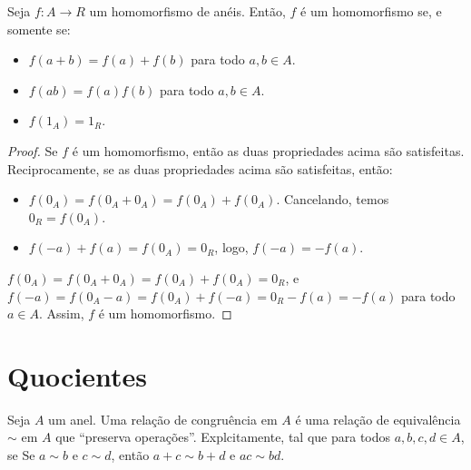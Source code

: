 \begin{prop}
    Seja $f:A\rightarrow R$ um homomorfismo de anéis. Então, $f$ é um homomorfismo se, e somente se:
    \begin{itemize}
        \item $f(a+b)=f(a)+f(b)$ para todo $a, b \in A$.
        \item $f(ab)=f(a)f(b)$ para todo $a, b \in A$.
        \item $f(1_A)=1_R$.
    \end{itemize}
\end{prop}
\begin{proof}
    Se $f$ é um homomorfismo, então as duas propriedades acima são satisfeitas. Reciprocamente, se as duas propriedades acima são satisfeitas, então:
    \begin{itemize}
    \item $f(0_A)=f(0_A+0_A)=f(0_A)+f(0_A)$. Cancelando, temos $0_R=f(0_A)$.
    \item $f(-a)+f(a)=f(0_A)=0_R$, logo, $f(-a)=-f(a)$.
    \end{itemize} $f(0_A)=f(0_A+0_A)=f(0_A)+f(0_A)=0_R$, e $f(-a)=f(0_A-a)=f(0_A)+f(-a)=0_R-f(a)=-f(a)$ para todo $a \in A$. Assim, $f$ é um homomorfismo.
\end{proof}

\section{Quocientes}
\begin{definition}
    Seja $A$ um anel. Uma relação de congruência em $A$ é uma relação de equivalência $\sim$ em $A$ que ``preserva operações''. Explcitamente, tal que para todos $a, b, c, d \in A$, se Se $a\sim b$ e $c\sim d$, então $a+c\sim b+d$ e $ac\sim bd$.
\end{definition}

